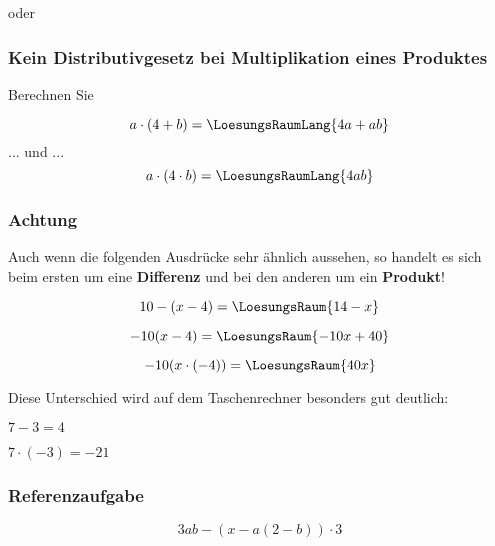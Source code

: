\begin{beispiel}{}{}
oder \TRAINER{\\}
\end{beispiel}

\subsubsection{Kein Distributivgesetz bei Multiplikation eines Produktes}
Berechnen Sie

$$a\cdot{}(4+b) = \LoesungsRaumLang{4a + ab}$$
 ... und ...
$$ a\cdot{}(4\cdot{}b) = \LoesungsRaumLang{4ab} $$

\newpage

\subsubsection{Achtung}
Auch wenn die folgenden Ausdrücke sehr ähnlich aussehen, so
handelt es sich beim ersten um eine \textbf{Differenz} und bei den anderen um
ein \textbf{Produkt}!

$$10-(x-4) =\LoesungsRaum{14-x}$$

$$-10(x-4) = \LoesungsRaum{-10x + 40}$$

$$-10(x\cdot{}(-4)) = \LoesungsRaum{40x}$$

Diese Unterschied wird auf dem Taschenrechner besonders gut deutlich:

    $ 7 - 3 = 4$

\vspace{3mm}
   $ 7\cdot{}(-3) = -21$


\subsubsection{Referenzaufgabe}
$$3ab-(x-a(2-b))\cdot{}3$$



